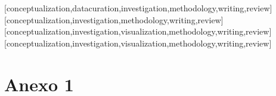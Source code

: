 \documentclass[spanish]{textolivre}
\begin{document}
\begin{contributors}
[conceptualization,datacuration,investigation,methodology,writing,review]
[conceptualization,investigation,methodology,writing,review]
[conceptualization,investigation,visualization,methodology,writing,review]
[conceptualization,investigation,visualization,methodology,writing,review]
\end{contributors}

\clearpage
\appendix 
\section*{Anexo 1}\label{anex1}
\end{document}
